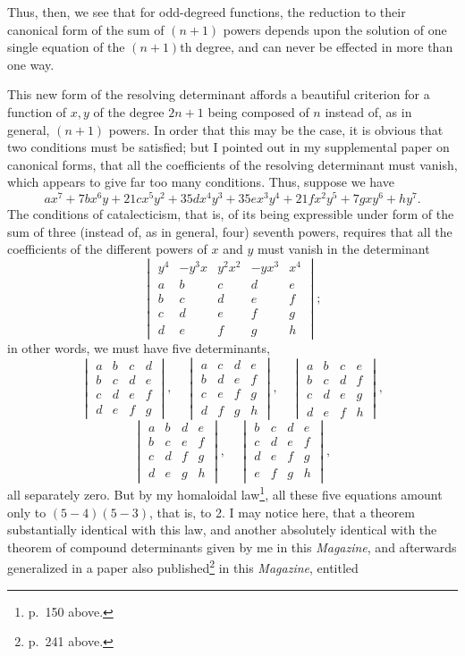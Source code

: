\documentclass[11pt]{article}
\newcommand{\sourcepage}[1]{\marginpar{\scriptsize p.~#1}}
\begin{document}
{{\sourcepage{268}
Thus, then, we see that for odd-degreed functions, the reduction to their canonical form of the sum of $(n+1)$ powers depends upon the solution of one single equation of the $(n+1)$th degree, and can never be effected in more than one way.

This new form of the resolving determinant affords a beautiful criterion for a function of $x,y$ of the degree $2n+1$ being composed of $n$ instead of, as in general, $(n+1)$ powers. In order that this may be the case, it is obvious that two conditions must be satisfied; but I pointed out in my supplemental paper on canonical forms, that all the coefficients of the resolving determinant must vanish, which appears to give far too many conditions. Thus, suppose we have
\[
ax^7+7bx^6y+21cx^5y^2+35dx^4y^3+35ex^3y^4+21fx^2y^5+7gxy^6+hy^7.
\]
The conditions of catalecticism, that is, of its being expressible under form of the sum of three (instead of, as in general, four) seventh powers, requires that all the coefficients of the different powers of $x$ and $y$ must vanish in the determinant
\[
\begin{vmatrix}
y^4&-y^3x&y^2x^2&-yx^3&x^4\\
a&b&c&d&e\\
b&c&d&e&f\\
c&d&e&f&g\\
d&e&f&g&h
\end{vmatrix};
\]
in other words, we must have five determinants,
\[
\begin{vmatrix}a&b&c&d\\ b&c&d&e\\ c&d&e&f\\ d&e&f&g\end{vmatrix},\quad
\begin{vmatrix}a&c&d&e\\ b&d&e&f\\ c&e&f&g\\ d&f&g&h\end{vmatrix},\quad
\begin{vmatrix}a&b&c&e\\ b&c&d&f\\ c&d&e&g\\ d&e&f&h\end{vmatrix},
\]
\[
\begin{vmatrix}a&b&d&e\\ b&c&e&f\\ c&d&f&g\\ d&e&g&h\end{vmatrix},\quad
\begin{vmatrix}b&c&d&e\\ c&d&e&f\\ d&e&f&g\\ e&f&g&h\end{vmatrix},
\]
all separately zero. But by my homaloidal law\footnote{p.~150 above.}, all these five equations amount only to $(5-4)(5-3)$, that is, to 2. I may notice here, that a theorem substantially identical with this law, and another absolutely identical with the theorem of compound determinants given by me in this \emph{Magazine}, and afterwards generalized in a paper also published\footnote{p.~241 above.} in this \emph{Magazine}, entitled


}}
\end{document}
